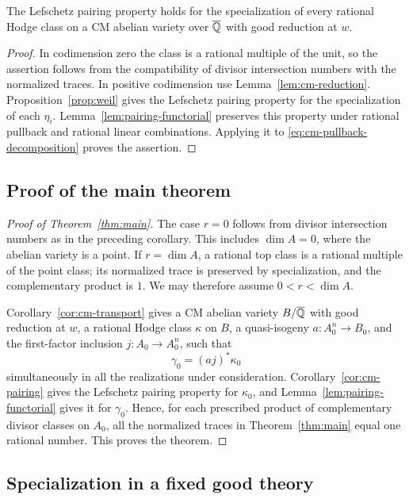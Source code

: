 \begin{corollary}
\label{cor:cm-pairing}
The Lefschetz pairing property holds for the specialization of every
rational Hodge class on a CM abelian variety over $\overline{\mathbb Q}$ with good
reduction at $w$.
\end{corollary}

\begin{proof}
In codimension zero the class is a rational multiple of the unit, so
the assertion follows from the compatibility of divisor intersection
numbers with the normalized traces.  In positive codimension use
Lemma~\ref{lem:cm-reduction}.  Proposition~\ref{prop:weil} gives the
Lefschetz pairing property for the specialization of each $\eta_i$.
Lemma~\ref{lem:pairing-functorial} preserves this property under
rational pullback and rational linear combinations.  Applying it to
\eqref{eq:cm-pullback-decomposition} proves the assertion.
\end{proof}

\subsection{Proof of the main theorem}

\begin{proof}[Proof of Theorem~\ref{thm:main}]
The case \(r=0\) follows from divisor intersection numbers as in the
preceding corollary. This includes \(\dim A=0\), where the abelian
variety is a point. If \(r=\dim A\), a rational top class is a
rational multiple of the point class; its normalized trace is
preserved by specialization, and the complementary product is \(1\).
We may therefore assume \(0<r<\dim A\).

Corollary~\ref{cor:cm-transport} gives a CM abelian variety $B/\overline{\mathbb Q}$ with good
reduction at $w$, a rational Hodge class $\kappa$ on $B$, a
quasi-isogeny $a\colon A_0^n\to B_0$, and the first-factor inclusion
$j\colon A_0\to A_0^n$, such that
\[
                            \gamma_0=(aj)^*\kappa_0
\]
simultaneously in all the realizations under consideration.
Corollary~\ref{cor:cm-pairing} gives the Lefschetz pairing property for
$\kappa_0$, and Lemma~\ref{lem:pairing-functorial} gives it for
$\gamma_0$.  Hence, for each prescribed product of complementary
divisor classes on $A_0$, all the normalized traces in
Theorem~\ref{thm:main} equal one rational number.  This proves the
theorem.
\end{proof}

\subsection{Specialization in a fixed good theory}

